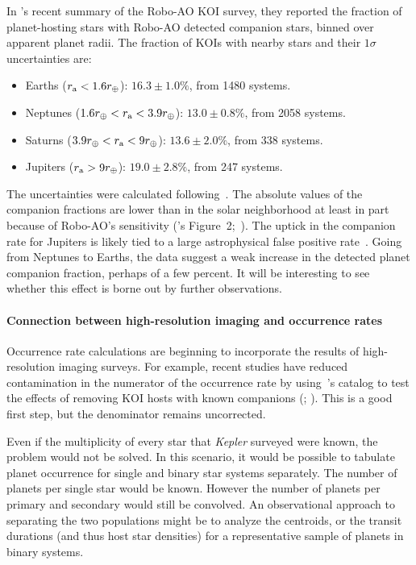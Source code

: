 \documentclass[12pt,modern]{aastex61}
\renewcommand{\a}{_{\rm a}}
\begin{document}
In \citet{ziegler_robo-ao_2017}'s recent summary of the Robo-AO KOI
survey, they reported the fraction of planet-hosting stars with
Robo-AO detected companion stars, binned over apparent planet radii.
The fraction of KOIs with nearby stars and their $1\sigma$
uncertainties are:
\begin{itemize}
    \item Earths ($r\a < 1.6r_\oplus$): $16.3 \pm 1.0\%$, from 1480
    systems.
    \item Neptunes ($1.6r_\oplus < r\a < 3.9 r_\oplus$): $13.0 \pm
    0.8\%$, from 2058 systems.
    \item Saturns ($3.9r_\oplus < r\a < 9 r_\oplus$): $13.6 \pm 2.0\%$, from 338 systems. 
    \item Jupiters ($r\a > 9r_\oplus$): $19.0 \pm 2.8\%$, from 247 systems. 
\end{itemize} 
The uncertainties were calculated
following~\citet{burgasser_binarity_2003}.  The absolute values of the
companion fractions are lower than in the solar neighborhood at
least in part because of Robo-AO's sensitivity
(\citealt{ziegler_robo-ao_2017}'s
Figure~2;~\citealt{raghavan_survey_2010}).
The uptick in the companion rate for Jupiters is likely tied to a
large astrophysical false positive rate~\citep{santerne_sophie_2012}.
Going from Neptunes to Earths, the data suggest a weak increase in the
detected planet companion fraction, perhaps of a few percent.  It will
be interesting to see whether this effect is borne out by further
observations.


\paragraph{Connection between high-resolution imaging and occurrence rates}

Occurrence rate calculations are beginning to incorporate the results
of high-resolution imaging surveys.  For example, recent studies have
reduced contamination in the numerator of the occurrence rate by
using~\citet{furlan_kepler_2017}'s catalog to test the effects of
removing KOI hosts with known companions
(\citealt{fulton_california-_2017}; \citealt{petigura_CKS_2017}).
This is a good first step, but the denominator remains uncorrected.  

Even if the multiplicity of every star that {\it Kepler} surveyed were
known, the problem would not be solved. In this scenario, it would be
possible to tabulate planet occurrence for single and binary star
systems separately.  The number of planets per single star would
be known.  However the number of planets per primary and secondary
would still be convolved.  An observational approach to separating the
two populations might be to analyze the centroids, or the transit
durations (and thus host star densities) for a representative sample
of planets in binary systems. 
\end{document}
